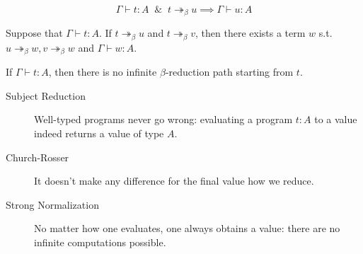 \documentclass[UTF8,11pt,colorlinks,compress,openany]{beamer}%
\begin{document}
\begin{frame}\frametitle{}
\setlength\abovedisplayskip{0pt}
\setlength\belowdisplayskip{0pt}
\begin{lemma}
\centerline{}
\end{lemma}\vspace*{-1ex}
\begin{theorem}
\[\Gamma\vdash t: A\;\;\&\;\;t\twoheadrightarrow_\beta u\implies\Gamma\vdash u: A\]
\end{theorem}\vspace*{-1ex}
\begin{theorem}
Suppose that $\Gamma\vdash t: A$. If $t\twoheadrightarrow_\beta u$ and $t\twoheadrightarrow_\beta v$, then there exists a term $w$ s.t. $u\twoheadrightarrow_\beta w, v\twoheadrightarrow_\beta w$ and $\Gamma\vdash w: A$.
\end{theorem}\vspace*{-1ex}
\begin{theorem}
If $\Gamma\vdash t: A$, then there is no infinite $\beta$-reduction path starting
from $t$.
\end{theorem}
{\small 
\begin{description}
\item[Subject Reduction]
Well-typed programs never go wrong: evaluating a program $t: A$ to a value indeed returns a value of type $A$.
\item[Church-Rosser] It doesn't make any difference for the final value how we reduce.
\item[Strong Normalization] No matter how one evaluates, one always obtains a value: there are no infinite computations possible.
\end{description}
}
\end{frame}
\end{document}
